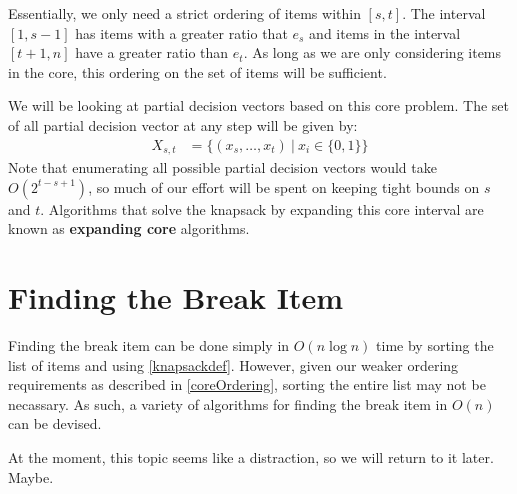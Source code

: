 \documentclass{article}
\begin{document}
Essentially, we only need a strict ordering of items within $[s,t]$. The interval $[1,s-1]$ has items with a greater ratio that $e_s$ and items in the interval $[t+1, n]$ have a greater ratio than $e_t$. As long as we are only considering items in the core, this ordering on the set of items will be sufficient. 

We will be looking at partial decision vectors based on this core problem. The set of all partial decision vector at any step will be given by:
\begin{equation} \label{partialDec}
    \begin{aligned}
        X_{s,t} &= \{(x_s,\ldots,x_t) \ | \ x_i \in \{0,1\}\}
    \end{aligned}
\end{equation}
Note that enumerating all possible partial decision vectors would take $O(2^{t-s+1})$, so much of our effort will be spent on keeping tight bounds on $s$ and $t$. Algorithms that solve the knapsack by expanding this core interval are known as {\bf expanding core} algorithms. 

\section{Finding the Break Item}
Finding the break item can be done simply in $O(n \log n)$ time by sorting the list of items and using \ref{knapsackdef}. However, given our weaker ordering requirements as described in \ref{coreOrdering}, sorting the entire list may not be necassary. As such, a variety of algorithms for finding the break item in $O(n)$ can be devised. 

At the moment, this topic seems like a distraction, so we will return to it later. Maybe. 
\end{document}
